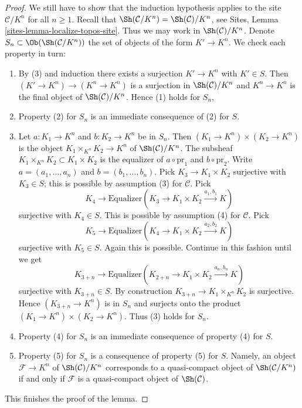 \begin{proof}
\medskip\noindent
We still have to show that the induction hypothesis applies
to the site $\mathcal{C}/K^n$ for all $n \geq 1$. Recall
that $\Sh(\mathcal{C}/K^n) = \Sh(\mathcal{C})/K^n$, see
Sites, Lemma \ref{sites-lemma-localize-topos-site}.
Thus we may work in $\Sh(\mathcal{C})/K^n$.
Denote $S_n \subset \Ob(\Sh(\mathcal{C}/K^n))$ the set
of objects of the form $K' \to K^n$. We check each property in turn:
\begin{enumerate}
\item By (3) and induction there exists a surjection
$K' \to K^n$ with $K' \in S$. Then $(K' \to K^n) \to (K^n \to K^n)$
is a surjection in $\Sh(\mathcal{C})/K^n$ and $K^n \to K^n$
is the final object of $\Sh(\mathcal{C})/K^n$. Hence (1) holds for $S_n$,
\item Property (2) for $S_n$ is an immediate consequence
of (2) for $S$.
\item Let $a : K_1 \to K^n$ and $b : K_2 \to K^n$ be in $S_n$.
Then $(K_1 \to K^n) \times (K_2 \to K^n)$ is the object
$K_1 \times_{K^n} K_2 \to K^n$ of $\Sh(\mathcal{C})/K^n$.
The subsheaf $K_1 \times_{K^n} K_2 \subset K_1 \times K_2$ is the
equalizer of $a \circ \text{pr}_1$ and $b \circ \text{pr}_2$.
Write $a = (a_1, \ldots, a_n)$ and $b = (b_1, \ldots, b_n)$.
Pick $K_3 \to K_1 \times K_2$ surjective with $K_3 \in S$;
this is possible by assumption (3) for $\mathcal{C}$.
Pick
$$
K_4
\longrightarrow
\text{Equalizer}(K_3 \to K_1 \times K_2 \xrightarrow{a_1, b_1} K)
$$
surjective with $K_4 \in S$.
This is possible by assumption (4) for $\mathcal{C}$.
Pick
$$
K_5
\longrightarrow
\text{Equalizer}(K_4 \to K_1 \times K_2 \xrightarrow{a_2, b_2} K)
$$
surjective with $K_5 \in S$.
Again this is possible. Continue in this fashion until we get
$$
K_{3 + n}
\longrightarrow
\text{Equalizer}(K_{2 + n} \to K_1 \times K_2 \xrightarrow{a_n, b_n} K)
$$
surjective with $K_{3 + n} \in S$. By construction
$K_{3 + n} \to K_1 \times_{K^n} K_2$
is surjective. Hence $(K_{3 + n} \to K^n)$ is in $S_n$ and
surjects onto the product $(K_1 \to K^n) \times (K_2 \to K^n)$.
Thus (3) holds for $S_n$.
\item Property (4) for $S_n$ is an immediate consequence of
property (4) for $S$.
\item Property (5) for $S_n$ is a consequence of
property (5) for $S$. Namely, an object $\mathcal{F} \to K^n$ of
$\Sh(\mathcal{C})/K^n$ corresponds to a quasi-compact object of
$\Sh(\mathcal{C}/K^n)$ if and only if $\mathcal{F}$ is a
quasi-compact object of $\Sh(\mathcal{C})$.
\end{enumerate}
This finishes the proof of the lemma.
\end{proof}

